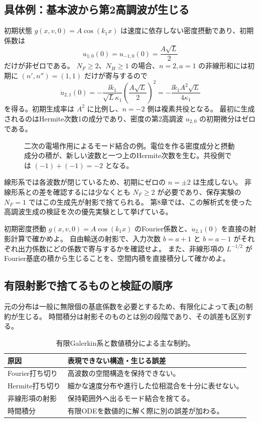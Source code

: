 \subsection{具体例：基本波から第2高調波が生じる}
初期状態 $g(x,v,0)=A\cos(k_1x)$ は速度に依存しない密度摂動であり、初期係数は
\[
u_{1,0}(0)=u_{-1,0}(0)=\frac{A\sqrt L}{2}
\]
だけが非ゼロである。
$N_F\geq2$、$N_H\geq1$ の場合、$n=2,a=1$ の非線形和には初期に $(n',n'')=(1,1)$ だけが寄与するので
\[
\boxed{\dot u_{2,1}(0)=-\frac{\ii k_1}{\sqrt L\kappa_1}
\left(\frac{A\sqrt L}{2}\right)^2
=-\frac{\ii k_1A^2\sqrt L}{4\kappa_1}}
\]
を得る。初期生成率は $A^2$ に比例し、$n=-2$ 側は複素共役となる。
最初に生成されるのはHermite次数1の成分であり、密度の第2高調波 $u_{2,0}$ の初期微分はゼロである。

\begin{figure}[htbp]
\centering

\caption{二次の電場作用によるモード結合の例。電位を作る密度成分と摂動成分の積が、新しい波数と一つ上のHermite次数を生む。共役側では $(-1)+(-1)=-2$ となる。}
\label{fig:nonlinear-mode-coupling}
\end{figure}

線形系では各波数が閉じているため、初期にゼロの $n=\pm2$ は生成しない。
非線形系との差を確認するには少なくとも $N_F\geq2$ が必要であり、保存実験の $N_F=1$ ではこの生成先が射影で捨てられる。
第8章では、この解析式を使った高調波生成の検証を次の優先実験として挙げている。

\begin{exercise}[射影係数の確認]
初期密度摂動 $g(x,v,0)=A\cos(k_1x)$ のFourier係数と、$\dot u_{2,1}(0)$ を直接の射影計算で確かめよ。
自由輸送の射影で、入力次数 $b=a+1$ と $b=a-1$ がそれぞれ出力係数にどの係数で寄与するかを確認せよ。
また、非線形項の $L^{-1/2}$ がFourier基底の積から生じることを、空間内積を直接積分して確かめよ。
\end{exercise}

\subsection{有限射影で捨てるものと検証の順序}
元の分布は一般に無限個の基底係数を必要とするため、有限化によって表\ref{tab:galerkin-errors}の制約が生じる。
時間積分は射影そのものとは別の段階であり、その誤差も区別する。
\begin{table}[htbp]
\centering\small
\caption{有限Galerkin系と数値積分による主な制約。}
\label{tab:galerkin-errors}
\begin{tabularx}{\textwidth}{lX}
\toprule 原因 & 表現できない構造・生じる誤差 \\\midrule
Fourier打ち切り & 高波数の空間構造を保持できない。\\
Hermite打ち切り & 細かな速度分布や進行した位相混合を十分に表せない。\\
非線形項の射影 & 保持範囲外へ出るモード結合を捨てる。\\
時間積分 & 有限ODEを数値的に解く際に別の誤差が加わる。\\
\bottomrule
\end{tabularx}
\end{table}

